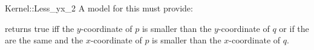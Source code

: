 \begin{ccRefFunctionObjectConcept}{Kernel::Less_yx_2}
A model for this must provide:


{returns true iff the $y$-coordinate of $p$ is smaller than the
$y$-coordinate of $q$ or if the are the same and 
the $x$-coordinate of $p$ is smaller than the $x$-coordinate of $q$.}

\ccIsModel{}

\end{ccRefFunctionObjectConcept}
